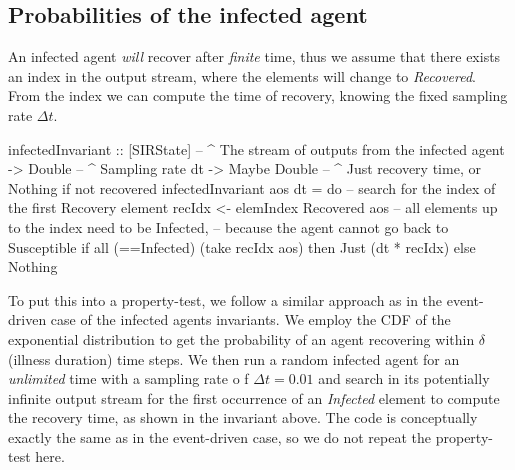 \subsection{Probabilities of the infected agent}
An infected agent \textit{will} recover after \textit{finite} time, thus we assume that there exists an index in the output stream, where the elements will change to \textit{Recovered}. From the index we can compute the time of recovery, knowing the fixed sampling rate $\Delta t$.

\begin{HaskellCode}
infectedInvariant :: [SIRState]     -- ^ The stream of outputs from the infected agent
                  -> Double         -- ^ Sampling rate dt
                  -> Maybe Double   -- ^ Just recovery time, or Nothing if not recovered
infectedInvariant aos dt  = do
  -- search for the index of the first Recovery element
  recIdx <- elemIndex Recovered aos
  -- all elements up to the index need to be Infected,
  -- because the agent cannot go back to Susceptible
  if all (==Infected) (take recIdx aos)
    then Just (dt * recIdx)
    else Nothing
\end{HaskellCode}

To put this into a property-test, we follow a similar approach as in the event-driven case of the infected agents invariants. We employ the CDF of the exponential distribution to get the probability of an agent recovering within $\delta$ (illness duration) time steps. We then run a random infected agent for an \textit{unlimited} time with a sampling rate o f $\Delta t = 0.01$ and search in its potentially infinite output stream for the first occurrence of an \textit{Infected} element to compute the recovery time, as shown in the invariant above. The code is conceptually exactly the same as in the event-driven case, so we do not repeat the property-test here.

%
%
%

